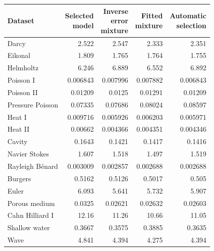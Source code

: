 \begin{tabular}{lrrrr}
\toprule
Dataset & \shortstack[r]{Selected\\model} & \shortstack[r]{Inverse\\error\\mixture} & \shortstack[r]{Fitted\\mixture} & \shortstack[r]{Automatic\\selection} \\
\midrule
Darcy & 2.522 & 2.547 & 2.333 & 2.351 \\
Eikonal & 1.809 & 1.765 & 1.764 & 1.755 \\
Helmholtz & 6.246 & 6.889 & 6.552 & 6.892 \\
Poisson I & 0.006843 & 0.007996 & 0.007882 & 0.006843 \\
Poisson II & 0.01209 & 0.0125 & 0.01291 & 0.01209 \\
Pressure Poisson & 0.07335 & 0.07686 & 0.08024 & 0.08597 \\
Heat I & 0.009716 & 0.005926 & 0.006203 & 0.005971 \\
Heat II & 0.00662 & 0.004366 & 0.004351 & 0.004346 \\
Cavity & 0.1643 & 0.1421 & 0.1417 & 0.1416 \\
Navier Stokes & 1.607 & 1.518 & 1.497 & 1.519 \\
Rayleigh Bénard & 0.003009 & 0.002857 & 0.002688 & 0.002688 \\
Burgers & 0.5162 & 0.5126 & 0.5017 & 0.505 \\
Euler & 6.093 & 5.641 & 5.732 & 5.907 \\
Porous medium & 0.0325 & 0.02621 & 0.02632 & 0.02603 \\
Cahn Hilliard I & 12.16 & 11.26 & 10.66 & 11.05 \\
Shallow water & 0.3667 & 0.3575 & 0.3885 & 0.3635 \\
Wave & 4.841 & 4.394 & 4.275 & 4.394 \\
\bottomrule
\end{tabular}
